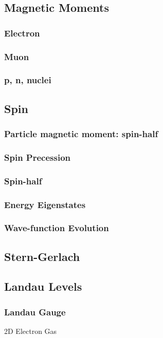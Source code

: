 \documentclass[12pt,a4paper]{article}
\begin{document}
\subsection{Magnetic Moments}
\subsubsection{Electron}
\subsubsection{Muon}
\subsubsection{p, n, nuclei}
\subsection{Spin}
\subsubsection{Particle magnetic moment: spin-half}
\subsubsection{Spin Precession}
\subsubsection{Spin-half}
\subsubsection{Energy Eigenstates}
\subsubsection{Wave-function Evolution}
\subsection{Stern-Gerlach}
\subsection{Landau Levels}
\subsubsection{Landau Gauge}
\begin{example}
    {2D Electron Gas}
    {}
\end{example}
\end{document}
